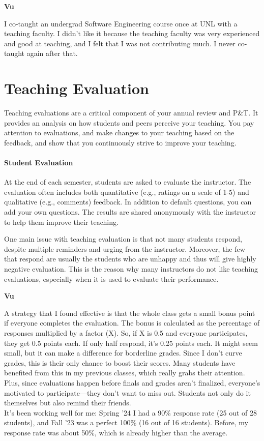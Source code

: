 \documentclass[oneside,11pt,dvipsnames]{book}
\newenvironment{commentbox}[1][]{
  \small
  \begin{mybox}
    {\small \textbf{#1}}
  }{
  \end{mybox}
}
\begin{document}
\begin{commentbox}[Vu]
I co-taught an undergrad Software Engineering course once at UNL with a teaching faculty.  I didn't like it because the teaching faculty was very experienced and good at teaching, and I felt that I was not contributing much.  I never co-taught again after that.
\end{commentbox}


\section{Teaching Evaluation}\label{sec:teaching-evaluation}

Teaching evaluations are a critical component of your annual review and P\&T. It provides an analysis on how students and peers perceive your teaching. 
You pay attention to evaluations, and make changes to your teaching based on the feedback, and show that you continuously strive to improve your teaching.  

\paragraph{Student Evaluation}
At the end of each semester, students are asked to evaluate the instructor. The evaluation often includes both quantitative (e.g., ratings on a scale of 1-5) and qualitative (e.g., comments) feedback.  In addition to default questions, you can add your own questions. The results are shared anonymously with the instructor to help them improve their teaching. 

One main issue with teaching evaluation is that not many students respond, despite multiple reminders and urging from the instructor.  Moreover, the few that respond are usually the students who are unhappy and thus will give highly negative evaluation. This is the reason why many instructors do not like teaching evaluations, especially when it is used to evaluate their performance.

\begin{commentbox}[Vu]
  A strategy that I found effective is that the whole class gets a small bonus point if everyone completes the evaluation. The bonus is calculated as the percentage of responses multiplied by a factor (X). So, if X is 0.5 and everyone participates, they get 0.5 points each. If only half respond, it's 0.25 points each. It might seem small, but it can make a difference for borderline grades. Since I don't curve grades, this is their only chance to boost their scores. Many students have benefited from this in my previous classes, which really grabs their attention. Plus, since evaluations happen before finals and grades aren't finalized, everyone's motivated to participate—they don't want to miss out. Students not only do it themselves but also remind their friends. 
  \\

  It's been working well for me: Spring '24 I had a 90\% response rate (25 out of 28 students), and Fall '23 was a perfect 100\% (16 out of 16 students). Before, my response rate was about 50\%, which is already higher than the average.
  \end{commentbox}
\end{document}
